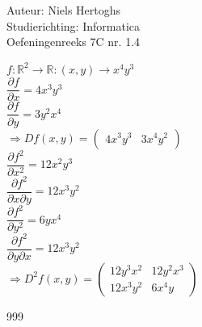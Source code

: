 \documentclass[a4paper]{article}
\begin{document}
  
\noindent \large Auteur: Niels Hertoghs \\
\noindent \large Studierichting: Informatica\\
\noindent \large Oefeningenreeks 7C nr. 1.4\\

\medskip

\normalsize

$ f: \mathbb{R}^2 \rightarrow \mathbb{R} : (x, y) \rightarrow x^4y^3$ \\

$\dfrac{\partial f}{\partial x} = 4x^3y^3 $ \\

$\dfrac{\partial f}{\partial y} = 3y^2x^4 $ \\

$ \Rightarrow
Df(x,y) = \left(
\begin{array}{cc} 
4x^3 y^3 & 3x^4y^2  
\end{array}\right)$\\

$\dfrac{\partial f^2}{\partial x^2} =12x^2y^3$\\

$\dfrac{\partial f^2}{\partial x\partial y}= 12x^3y^2$ \\

$\dfrac{\partial f^2}{\partial y^2} = 6yx^4$\\

$\dfrac{\partial f^2}{\partial y\partial x}= 12x^3y^2$ \\


$ \Rightarrow
D^2f(x,y) = \left( \begin{array}{ccc}
12y^3x^2 & 12y^2x^3 \\
12x^3y^2 & 6x^4y
\end{array} \right)$\\


\begin{thebibliography}{999}
\end{thebibliography}
\end{document}

